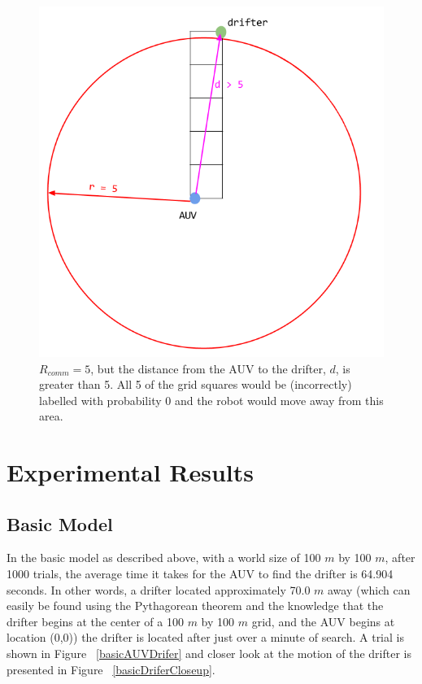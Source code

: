 \documentclass[a4paper, 11pt]{article} %
\begin{document}
\begin{figure}[H]
	\vspace{-20pt}
	\begin{center}
		\includegraphics[scale=0.30]{wrongToZero.png}
		\vspace{-20pt}
	\end{center}
\caption{$R_{comm} = 5$, but the distance from the AUV to the drifter, $d$, is greater than 5. All 5 of the grid squares would be (incorrectly) labelled with probability 0 and the robot would move away from this area. \label{wrongToZero}}
\vspace{10pt}
\end{figure}


\section*{Experimental Results}


\subsection*{Basic Model} 

In the basic model as described above, with a world size of 100 $m$ by 100 $m$, after 1000 trials, the average time it takes for the AUV to find the drifter is 64.904 seconds. In other words, a drifter located approximately 70.0 $m$ away (which can easily be found using the Pythagorean theorem and the knowledge that the drifter begins at the center of a 100 $m$ by 100 $m$ grid, and the AUV begins at location (0,0)) the drifter is located after just over a minute of search. A trial is shown in Figure ~\ref{basicAUVDrifer} and  closer look at the motion of the drifter is presented in Figure ~\ref{basicDriferCloseup}.   
\end{document}
